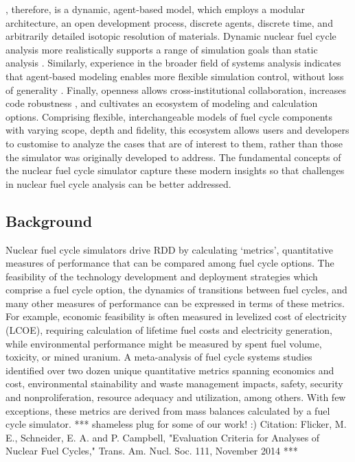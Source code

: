 \Cyclus, therefore, is a dynamic, agent-based model, which employs a modular
architecture, an open development process, discrete agents, discrete time, and
arbitrarily detailed isotopic resolution of materials. Dynamic nuclear fuel
cycle analysis more realistically supports a range of simulation goals than
static analysis
\cite{piet_dynamic_2011}. Similarly, experience in the broader field of systems
analysis indicates that agent-based modeling enables more flexible simulation
control, without loss of generality \cite{macal_agent-based_2010}. Finally, openness
allows cross-institutional collaboration, increases code robustness \cite{cohen_modern_2010}, and
cultivates an ecosystem of modeling and calculation options.  Comprising flexible, interchangeable models of fuel cycle components with varying scope, depth and fidelity, this ecosystem allows users and developers to customise \Cyclus to analyze the cases that are of interest to them, rather than those the simulator was originally developed to address.  The fundamental concepts of the \Cyclus
nuclear fuel cycle simulator capture these modern insights so that challenges
in nuclear fuel cycle analysis can be better addressed.

\subsection{Background}



Nuclear fuel cycle simulators drive \gls{RDD} by calculating `metrics',
quantitative measures of performance that
can be compared among fuel cycle options. The feasibility of the technology development and deployment
strategies which comprise a fuel cycle option, the dynamics of transitions between fuel cycles, and many other
measures of performance can be expressed in terms of these metrics. For example,
economic feasibility is often measured in levelized cost of electricity (\gls{LCOE}), requiring calculation of
lifetime fuel costs and electricity generation,
while environmental performance might be measured by spent fuel volume,
  toxicity, or mined uranium.  A meta-analysis of fuel cycle systems studies identified over two dozen unique quantitative metrics spanning economics and cost, environmental stainability and waste management impacts, safety, security and nonproliferation, resource adequacy and utilization, among others. With few exceptions, these metrics are derived from mass balances calculated by a fuel cycle simulator. *** shameless plug for some of our work! :)  Citation: Flicker, M. E., Schneider, E. A. and P. Campbell, "Evaluation Criteria for Analyses of Nuclear Fuel Cycles," Trans. Am. Nucl. Soc. 111, November 2014 ***

